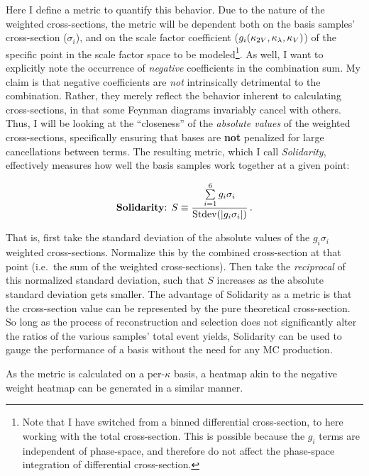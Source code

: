     Here I define a metric to quantify this behavior.
    Due to the nature of the weighted cross-sections,
        the metric will be dependent both on the basis samples' cross-section ($\sigma_i$),
        and on the scale factor coefficient ($g_i(\kappa_{2V},\kappa_{\lambda},\kappa_{V})$) of the specific point in the scale factor space to be modeled\footnote{
            Note that I have switched from a binned differential cross-section, to here working with the total cross-section.
            This is possible because the $g_i$ terms are independent of phase-space,
                and therefore do not affect the phase-space integration of differential cross-section.
        }.
    As well, I want to explicitly note the occurrence of \textit{negative} coefficients in the combination sum.
    My claim is that negative coefficients are \textit{not} intrinsically detrimental to the combination.
    Rather, they merely reflect the behavior inherent to calculating cross-sections,
        in that some Feynman diagrams invariably cancel with others.
    Thus, I will be looking at the ``closeness'' of the \textit{absolute values} of the weighted cross-sections,
        specifically ensuring that bases are \textbf{not} penalized for large cancellations between terms.
    The resulting metric, which I call \textit{Solidarity}, effectively measures how well the basis samples work together at a given point:

    \begin{equation}
        \textrm{\textbf{Solidarity}: }S \equiv \frac{ \sum\limits_{i=1}^6 g_i\sigma_i }{ \textrm{Stdev}(|g_i\sigma_i|) }
        \,.
    \end{equation}

    That is, first take the standard deviation of the absolute values of the $ g_i \sigma_i $ weighted cross-sections.
    Normalize this by the combined cross-section at that point (i.e.\ the sum of the weighted cross-sections).
    Then take the \textit{reciprocal} of this normalized standard deviation,
        such that $S$ increases as the absolute standard deviation gets smaller.
    The advantage of Solidarity as a metric
        is that the cross-section value can be represented by the pure theoretical cross-section.
    So long as the process of reconstruction and selection does not significantly alter the ratios of the various samples' total event yields,
        Solidarity can be used to gauge the performance of a basis without the need for any MC production.

    As the metric is calculated on a per-$\kappa$ basis,
        a heatmap akin to the negative weight heatmap can be generated in a similar manner.

